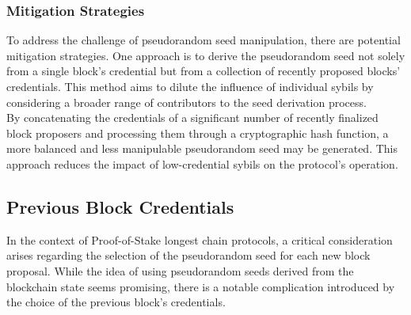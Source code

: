 \subsubsection{Mitigation Strategies}
To address the challenge of pseudorandom seed manipulation, there are potential mitigation strategies. One approach is to derive the pseudorandom seed not solely from a single block's credential but from a collection of recently proposed blocks' credentials. This method aims to dilute the influence of individual sybils by considering a broader range of contributors to the seed derivation process.\\
By concatenating the credentials of a significant number of recently finalized block proposers and processing them through a cryptographic hash function, a more balanced and less manipulable pseudorandom seed may be generated. This approach reduces the impact of low-credential sybils on the protocol's operation.

\subsection{Previous Block Credentials}
In the context of Proof-of-Stake longest chain protocols, a critical consideration arises regarding the selection of the pseudorandom seed for each new block proposal. While the idea of using pseudorandom seeds derived from the blockchain state seems promising, there is a notable complication introduced by the choice of the previous block's credentials.

